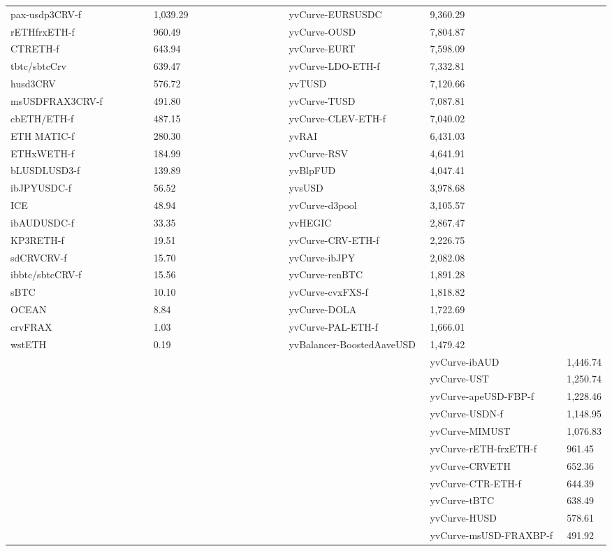 \begin{longtable}{@{}p{0.25\linewidth}p{0.25\linewidth}p{0.25\linewidth}p{0.25\linewidth}@{}}
pax-usdp3CRV-f & 1,039.29 & yvCurve-EURSUSDC & 9,360.29 \\
rETHfrxETH-f & 960.49 & yvCurve-OUSD & 7,804.87 \\
CTRETH-f & 643.94 & yvCurve-EURT & 7,598.09 \\
tbtc/sbtcCrv & 639.47 & yvCurve-LDO-ETH-f & 7,332.81 \\
husd3CRV & 576.72 & yvTUSD & 7,120.66 \\
msUSDFRAX3CRV-f & 491.80 & yvCurve-TUSD & 7,087.81 \\
cbETH/ETH-f & 487.15 & yvCurve-CLEV-ETH-f & 7,040.02 \\
ETH MATIC-f & 280.30 & yvRAI & 6,431.03 \\
ETHxWETH-f & 184.99 & yvCurve-RSV & 4,641.91 \\
bLUSDLUSD3-f & 139.89 & yvBlpFUD & 4,047.41 \\
ibJPYUSDC-f & 56.52 & yvsUSD & 3,978.68 \\
ICE & 48.94 & yvCurve-d3pool & 3,105.57 \\
ibAUDUSDC-f & 33.35 & yvHEGIC & 2,867.47 \\
KP3RETH-f & 19.51 & yvCurve-CRV-ETH-f & 2,226.75 \\
sdCRVCRV-f & 15.70 & yvCurve-ibJPY & 2,082.08 \\
ibbtc/sbtcCRV-f & 15.56 & yvCurve-renBTC & 1,891.28 \\
sBTC & 10.10 & yvCurve-cvxFXS-f & 1,818.82 \\
OCEAN & 8.84 & yvCurve-DOLA & 1,722.69 \\
crvFRAX & 1.03 & yvCurve-PAL-ETH-f & 1,666.01 \\
wstETH & 0.19 & yvBalancer-BoostedAaveUSD & 1,479.42 \\
 & &  & yvCurve-ibAUD & 1,446.74 \\
 & &  & yvCurve-UST & 1,250.74 \\
 & &  & yvCurve-apeUSD-FBP-f & 1,228.46 \\
 & &  & yvCurve-USDN-f & 1,148.95 \\
 & &  & yvCurve-MIMUST & 1,076.83 \\
 & &  & yvCurve-rETH-frxETH-f & 961.45 \\
 & &  & yvCurve-CRVETH & 652.36 \\
 & &  & yvCurve-CTR-ETH-f & 644.39 \\
 & &  & yvCurve-tBTC & 638.49 \\
 & &  & yvCurve-HUSD & 578.61 \\
 & &  & yvCurve-msUSD-FRAXBP-f & 491.92 \\

\end{longtable}

